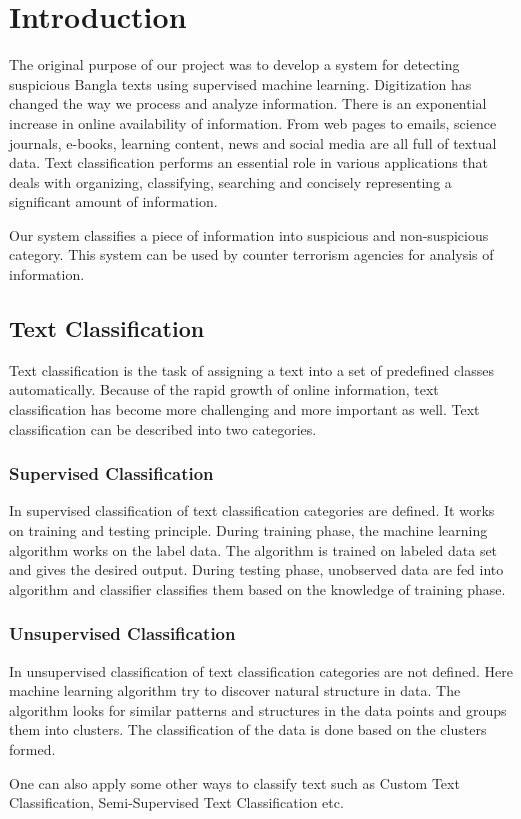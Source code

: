 \chapter{Introduction}

\thispagestyle{empty}
The original purpose of our project was to develop a system for detecting suspicious Bangla texts using supervised machine learning. Digitization has changed the way we process and analyze information. There is an exponential increase in online availability of information. From web pages to emails, science journals, e-books, learning content, news and social media are all full of textual data. Text classification performs an essential role in various applications that deals with organizing, classifying, searching and concisely representing a significant amount of information.\par
\vspace{.2cm}
Our system classifies a piece of information into suspicious and non-suspicious category. This system can be used by counter terrorism agencies for analysis of information.

\section{Text Classification}
Text classification is the task of assigning a text into a set of predefined classes automatically. Because of the rapid growth of online information, text classification has become more challenging and more important as well. Text classification can be described into two categories.
\subsection{Supervised Classification}
In supervised classification of text classification categories are defined. It works on training and testing principle. During training phase, the machine learning algorithm works on the label data. The algorithm is trained on labeled data set and gives the desired output. During testing phase, unobserved data are fed into algorithm and classifier classifies them based on the knowledge of training phase.
\subsection{Unsupervised Classification}
In unsupervised classification of text classification categories are not defined. Here machine learning algorithm try to discover natural structure in data. The algorithm looks for similar patterns and structures in the data points and groups them into clusters. The classification of the data is done based on the clusters formed.\par
One can also apply some other ways to classify text such as Custom Text Classification, Semi-Supervised Text Classification etc.

